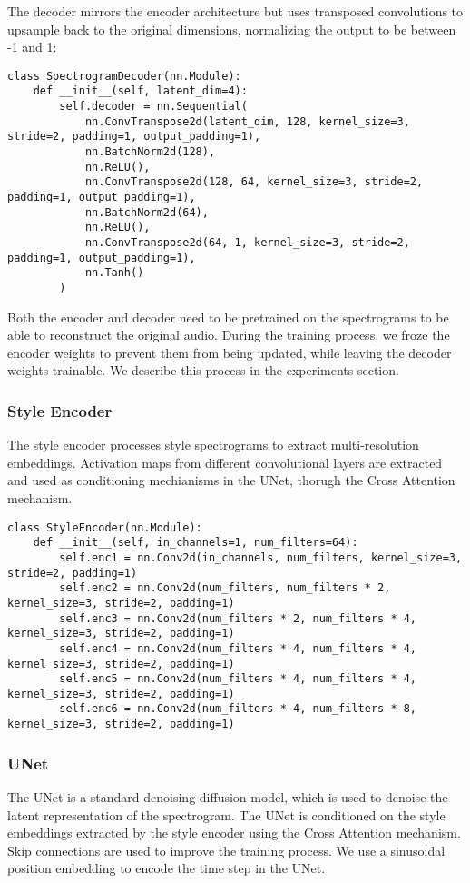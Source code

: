 \noindent  The decoder mirrors the encoder architecture but uses transposed convolutions to upsample back to the original dimensions, normalizing the output to be between -1 and 1:
\begin{lstlisting}[basicstyle=\tiny]
class SpectrogramDecoder(nn.Module):
    def __init__(self, latent_dim=4):
        self.decoder = nn.Sequential(
            nn.ConvTranspose2d(latent_dim, 128, kernel_size=3, stride=2, padding=1, output_padding=1),
            nn.BatchNorm2d(128),
            nn.ReLU(),
            nn.ConvTranspose2d(128, 64, kernel_size=3, stride=2, padding=1, output_padding=1),
            nn.BatchNorm2d(64),
            nn.ReLU(),
            nn.ConvTranspose2d(64, 1, kernel_size=3, stride=2, padding=1, output_padding=1),
            nn.Tanh()
        )
\end{lstlisting}

\noindent Both the encoder and decoder need to be pretrained on the spectrograms to be able to reconstruct the original audio. During the training process, we froze the encoder weights to prevent them from being updated, while leaving the decoder weights trainable. We describe this process in the experiments section.

\subsubsection{Style Encoder}
The style encoder processes style spectrograms to extract multi-resolution embeddings. Activation maps from different convolutional layers are extracted and used as conditioning mechianisms in the UNet, thorugh the Cross Attention mechanism.

\begin{lstlisting}[basicstyle=\tiny]
class StyleEncoder(nn.Module):
    def __init__(self, in_channels=1, num_filters=64):
        self.enc1 = nn.Conv2d(in_channels, num_filters, kernel_size=3, stride=2, padding=1)
        self.enc2 = nn.Conv2d(num_filters, num_filters * 2, kernel_size=3, stride=2, padding=1)
        self.enc3 = nn.Conv2d(num_filters * 2, num_filters * 4, kernel_size=3, stride=2, padding=1)
        self.enc4 = nn.Conv2d(num_filters * 4, num_filters * 4, kernel_size=3, stride=2, padding=1)
        self.enc5 = nn.Conv2d(num_filters * 4, num_filters * 4, kernel_size=3, stride=2, padding=1)
        self.enc6 = nn.Conv2d(num_filters * 4, num_filters * 8, kernel_size=3, stride=2, padding=1)
\end{lstlisting}

\subsubsection{UNet}
The UNet is a standard denoising diffusion model, which is used to denoise the latent representation of the spectrogram. The UNet is conditioned on the style embeddings extracted by the style encoder using the Cross Attention mechanism. Skip connections are used to improve the training process. We use a sinusoidal position embedding to encode the time step in the UNet.


